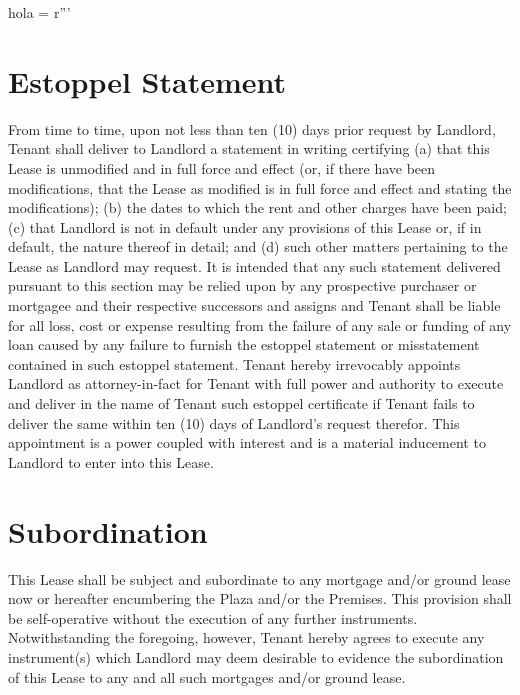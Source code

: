 hola = r'''\documentclass{article}
\begin{document}
\section{Estoppel Statement}
    From time to time, upon not less than ten (10) days prior request by Landlord, Tenant shall deliver to Landlord a statement in writing certifying (a) that this Lease is unmodified and in full force and effect (or, if there have been modifications, that the Lease as modified is in full force and effect and stating the modifications); (b) the dates to which the rent and other charges have been paid; (c) that Landlord is not in default under any provisions of this Lease or, if in default, the nature thereof in detail; and (d) such other matters pertaining to the Lease as Landlord may request. It is intended that any such statement delivered pursuant to this section may be relied upon by any prospective purchaser or mortgagee and their respective successors and assigns and Tenant shall be liable for all loss, cost or expense resulting from the failure of any sale or funding of any loan caused by any failure to furnish the estoppel statement or misstatement contained in such estoppel statement. Tenant hereby irrevocably appoints Landlord as attorney-in-fact for Tenant with full power and authority to execute and deliver in the name of Tenant such estoppel certificate if Tenant fails to deliver the same within ten (10) days of Landlord's request therefor. This appointment is a power coupled with interest and is a material inducement to Landlord to enter into this Lease.


\section{Subordination}
    This Lease shall be subject and subordinate to any mortgage and/or ground lease now or hereafter encumbering the Plaza and/or the Premises. This provision shall be self-operative without the execution of any further instruments.  Notwithstanding the foregoing, however, Tenant hereby agrees to execute any instrument(s) which Landlord may deem desirable to evidence the subordination of this Lease to any and all such mortgages and/or ground lease.
\end{document}

